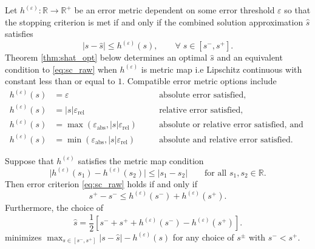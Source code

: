 \documentclass[graybox]{svmult}
\begin{document}
Let $h^{(\varepsilon)}: \mathbb{R} \to \mathbb{R}^+$ be an error metric dependent on some error threshold $\varepsilon$ so that the stopping criterion is met if and only if the combined solution approximation $\hat{s}$ satisfies 
\begin{equation}
    \lvert s-\hat{s} \rvert \leq h^{(\varepsilon)}(s), \qquad \forall\; s \in [s^-,s^+].
    \label{eq:sc_raw}
\end{equation}
Theorem \ref{thm:shat_opt} below determines an optimal $\hat{s}$ and an equivalent condition to \eqref{eq:sc_raw} when $h^{(\varepsilon)}$ is metric map i.e Lipschitz continuous with constant less than or equal to $1$. Compatible error metric options include
\begin{subequations}
\begin{align}
    h^{(\varepsilon)}(s) & = \varepsilon \quad &&\text{absolute error satisfied}, \label{eq:h_abs}\\
    h^{(\varepsilon)}(s) & = \lvert s \rvert \varepsilon_\text{rel} \quad &&\text{relative error satisfied}, \label{eq:h_rel}\\
    h^{(\varepsilon)}(s) &= \max\left(\varepsilon_\text{abs},\lvert s \rvert \varepsilon_\text{rel} \right) \quad &&\text{absolute or relative error satisfied, and } \label{eq:h_abs_or_rel} \\
    h^{(\varepsilon)}(s) &= \min\left(\varepsilon_\text{abs},\lvert s \rvert \varepsilon_\text{rel} \right) \quad &&\text{absolute and relative error satisfied.} \label{eq:h_abs_and_rel}
\end{align}
\end{subequations}
\begin{theorem} \label{thm:shat_opt}
    Suppose that  $h^{(\varepsilon)}$ satisfies the metric map condition
    $$\lvert h^{(\varepsilon)}(s_1) - h^{(\varepsilon)}(s_2) \rvert \leq \lvert s_1 - s_2 \rvert \qquad \text{for all } s_1,s_2 \in \mathbb{R}.$$
    Then error criterion  \eqref{eq:sc_raw} holds if and only if 
    \begin{equation}
        s^+-s^- \leq h^{(\varepsilon)}(s^-)+h^{(\varepsilon)}(s^+).
        \label{eq:sc}
    \end{equation}
    Furthermore, the choice of 
    \begin{equation}
        \hat{s} = \frac{1}{2}\left[s^-+s^++h^{(\varepsilon)}(s^-)-h^{(\varepsilon)}(s^+)\right].
        \label{eq:shat_opt}
    \end{equation}
    minimizes $\max_{s \in [s^-,s^+]} \lvert s - \hat{s} \rvert -h^{(\varepsilon)}(s)$ for any choice of $s^{\pm}$ with $s^- < s^+$.
\end{theorem}
\end{document}

